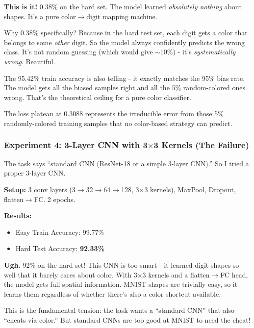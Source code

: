 \documentclass[9pt,a4paper,twocolumn,twoside]{tau-class/tau}
\begin{document}
        \begin{note}
            \textbf{This is it!} 0.38\% on the hard set. The model learned \textit{absolutely nothing} about shapes. It's a pure color$\rightarrow$digit mapping machine.

            Why 0.38\% specifically? Because in the hard test set, each digit gets a color that belongs to some \textit{other} digit. So the model always confidently predicts the wrong class. It's not random guessing (which would give $\sim$10\%) - it's \textit{systematically wrong}. Beautiful.

            The 95.42\% train accuracy is also telling - it exactly matches the 95\% bias rate. The model gets all the biased samples right and all the 5\% random-colored ones wrong. That's the theoretical ceiling for a pure color classifier.

            The loss plateau at 0.3088 represents the irreducible error from those 5\% randomly-colored training samples that no color-based strategy can predict.
        \end{note}

        \subsubsection{Experiment 4: 3-Layer CNN with 3$\times$3 Kernels (The Failure)}

        The task says ``standard CNN (ResNet-18 or a simple 3-layer CNN).'' So I tried a proper 3-layer CNN.

        \textbf{Setup:} 3 conv layers (3$\rightarrow$32$\rightarrow$64$\rightarrow$128, 3$\times$3 kernels), MaxPool, Dropout, flatten$\rightarrow$FC. 2 epochs.

        \textbf{Results:}
        \begin{itemize}
            \item Easy Train Accuracy: 99.77\%
            \item Hard Test Accuracy: \textbf{92.33\%}
        \end{itemize}

        \begin{note}
            \textbf{Ugh.} 92\% on the hard set! This CNN is too smart - it learned digit shapes so well that it barely cares about color. With 3$\times$3 kernels and a flatten$\rightarrow$FC head, the model gets full spatial information. MNIST shapes are trivially easy, so it learns them regardless of whether there's also a color shortcut available.

            This is the fundamental tension: the task wants a ``standard CNN'' that also ``cheats via color.'' But standard CNNs are too good at MNIST to need the cheat!
        \end{note}
\end{document}
